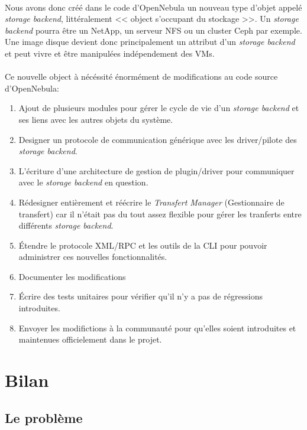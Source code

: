 \paragraph*{}
Nous avons donc créé dans le code d'OpenNebula un nouveau type d'objet appelé \emph{storage backend}, littéralement << object s'occupant du stockage >>.
Un \emph{storage backend} pourra être un NetApp, un serveur NFS ou un cluster Ceph par exemple. Une image disque devient donc principalement un attribut d'un
\emph{storage backend} et peut vivre et être manipulées indépendement des VMs.\\


\paragraph*{}
Ce nouvelle object à nécéssité énormément de modifications au code source d'OpenNebula:
\begin{enumerate}
	\item Ajout de plusieurs modules pour gérer le cycle de vie d'un \emph{storage backend} et ses liens avec les autres objets du système.
	\item Designer un protocole de communication générique avec les driver/pilote des \emph{storage backend}.
	\item L'écriture d'une architecture de gestion de plugin/driver pour communiquer avec le \emph{storage backend} en question.
	\item Rédesigner entièrement et réécrire le \emph{Transfert Manager} (Gestionnaire de transfert) car il n'était pas du tout assez flexible
		pour gérer les tranferts entre différents \emph{storage backend}.
	\item Étendre le protocole XML/RPC et les outils de la CLI pour pouvoir administrer ces nouvelles fonctionnalités.
	\item Documenter les modifications
	\item Écrire des tests unitaires pour vérifier qu'il n'y a pas de régressions introduites.
	\item Envoyer les modifictions à la communauté pour qu'elles soient introduites et maintenues officielement dans le projet.
\end{enumerate}

\section{Bilan}

\subsection{Le problème}

